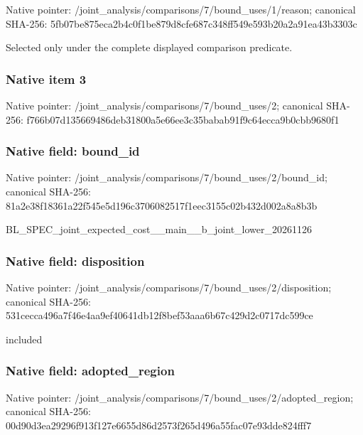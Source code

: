 \documentclass[10pt,a4paper]{article}
\begin{document}
Native pointer: /joint\_analysis/comparis\allowbreak{}ons/7/bound\_uses/1/reaso\allowbreak{}n; canonical SHA-256: 5fb07be875eca2b4c0f1be87\allowbreak{}9d8cfe687c348ff549e593b2\allowbreak{}0a2a91ea43b3303c


Selected only under the complete displayed comparison predicate.


\subsubsection{Native item 3}


Native pointer: /joint\_analysis/comparis\allowbreak{}ons/7/bound\_uses/2; canonical SHA-256: f766b07d135669486deb3180\allowbreak{}0a5e66ee3c35babab91f9c64\allowbreak{}ecca9b0cbb9680f1



\subsubsection{Native field: bound\_id}


Native pointer: /joint\_analysis/comparis\allowbreak{}ons/7/bound\_uses/2/bound\allowbreak{}\_id; canonical SHA-256: 81a2e38f18361a22f545e5d1\allowbreak{}96c3706082517f1eec3155c0\allowbreak{}2b432d002a8a8b3b


BL\_SPEC\_joint\_expected\_c\allowbreak{}ost\_\_main\_\_b\_joint\_lower\allowbreak{}\_20261126


\subsubsection{Native field: disposition}


Native pointer: /joint\_analysis/comparis\allowbreak{}ons/7/bound\_uses/2/dispo\allowbreak{}sition; canonical SHA-256: 531cecca496a7f46e4aa9ef4\allowbreak{}0641db12f8bef53aaa6b67c4\allowbreak{}29d2c0717dc599ce


included


\subsubsection{Native field: adopted\_region}


Native pointer: /joint\_analysis/comparis\allowbreak{}ons/7/bound\_uses/2/adopt\allowbreak{}ed\_region; canonical SHA-256: 00d90d3ea29296f913f127e6\allowbreak{}655d86d2573f265d496a55fa\allowbreak{}c07e93dde824fff7
\end{document}
